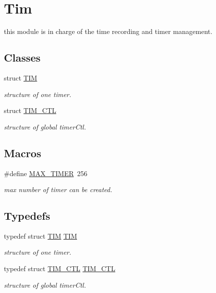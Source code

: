 \hypertarget{group__tim}{}\section{Tim}
\label{group__tim}


this module is in charge of the time recording and timer management.  


\subsection*{Classes}
\begin{DoxyCompactItemize}
\item 
struct \hyperlink{struct_t_i_m}{T\+I\+M}
\begin{DoxyCompactList}\small\item\em structure of one timer. \end{DoxyCompactList}\item 
struct \hyperlink{struct_t_i_m___c_t_l}{T\+I\+M\+\_\+\+C\+T\+L}
\begin{DoxyCompactList}\small\item\em structure of global timer\+Ctl. \end{DoxyCompactList}\end{DoxyCompactItemize}
\subsection*{Macros}
\begin{DoxyCompactItemize}
\item 
\hypertarget{group__tim_ga631a00e0b5343d37814e14770345ff9b}{}\#define \hyperlink{group__tim_ga631a00e0b5343d37814e14770345ff9b}{M\+A\+X\+\_\+\+T\+I\+M\+E\+R}~256\label{group__tim_ga631a00e0b5343d37814e14770345ff9b}

\begin{DoxyCompactList}\small\item\em max number of timer can be created. \end{DoxyCompactList}\end{DoxyCompactItemize}
\subsection*{Typedefs}
\begin{DoxyCompactItemize}
\item 
typedef struct \hyperlink{struct_t_i_m}{T\+I\+M} \hyperlink{group__tim_ga26669a4a8b52c4fd916ee5faf066be19}{T\+I\+M}
\begin{DoxyCompactList}\small\item\em structure of one timer. \end{DoxyCompactList}\item 
typedef struct \hyperlink{struct_t_i_m___c_t_l}{T\+I\+M\+\_\+\+C\+T\+L} \hyperlink{group__tim_ga4091d5ac2e18168e0642a8e7fb363590}{T\+I\+M\+\_\+\+C\+T\+L}
\begin{DoxyCompactList}\small\item\em structure of global timer\+Ctl. \end{DoxyCompactList}\end{DoxyCompactItemize}

